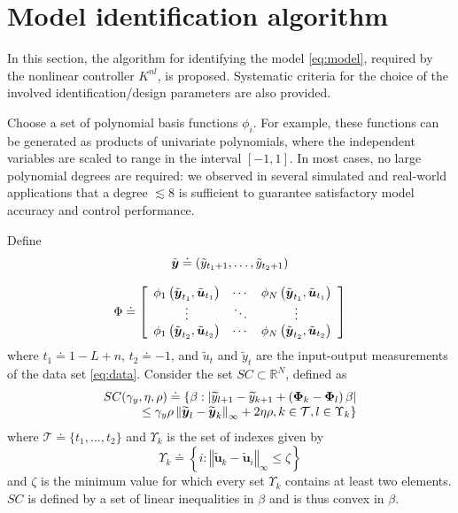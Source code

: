 \documentclass[twocolumn,english,journal]{IEEEtran}
\begin{document}
\section{Model identification algorithm}

\label{sec:design}

In this section, the algorithm for identifying the model \eqref{eq:model},
required by the nonlinear controller $K^{nl}$, is proposed. Systematic
criteria for the choice of the involved identification/design parameters
are also provided.

Choose a set of polynomial basis functions $\phi_{i}$. For example,
these functions can be generated as products of univariate polynomials,
where the independent variables are scaled to range in the interval
$[-1,1]$. In most cases, no large polynomial degrees are required:
we observed in several simulated and real-world applications that
a degree $\lesssim8$ is sufficient to guarantee satisfactory model
accuracy and control performance.

Define 
\[
\begin{array}[t]{c}
\tilde{\boldsymbol{y}}\doteq(\tilde{y}_{t_{1}+1},\ldots,\tilde{y}_{t_{2}+1})\\
\\
\Phi\doteq\left[\begin{array}{ccc}
\phi_{1}\left(\tilde{\boldsymbol{y}}_{t_{1}},\tilde{\boldsymbol{u}}_{t_{1}}\right) & \cdots & \phi_{N}\left(\tilde{\boldsymbol{y}}_{t_{1}},\tilde{\boldsymbol{u}}_{t_{1}}\right)\\
\vdots & \ddots & \vdots\\
\phi_{1}\left(\tilde{\boldsymbol{y}}_{t_{2}},\tilde{\boldsymbol{u}}_{t_{2}}\right) & \cdots & \phi_{N}\left(\tilde{\boldsymbol{y}}_{t_{2}},\tilde{\boldsymbol{u}}_{t_{2}}\right)
\end{array}\right]
\end{array}
\]
where $t_{1}\doteq1-L+n$, $t_{2}\doteq-1$, and $\tilde{u}_{t}$
and $\tilde{y}_{t}$ are the input-output measurements of the data
set \eqref{eq:data}. Consider the set $SC\subset\mathbb{R}^{N}$,
defined as
\[
\begin{array}[t]{r}
SC(\gamma_{y},\eta,\rho)\doteq\{\beta:\left\vert \widetilde{y}_{l+1}-\widetilde{y}_{k+1}+\left(\mathbf{\Phi}_{k}-\mathbf{\Phi}_{l}\right)\beta\right\vert \\
\leq\gamma_{y}\rho\left\Vert \widetilde{\boldsymbol{y}}_{l}-\widetilde{\boldsymbol{y}}_{k}\right\Vert _{\infty}+2\eta\rho,k\in\mathcal{T},l\in\Upsilon_{k}\}
\end{array}
\]
where $\mathcal{T}\doteq\{t_{1},\ldots,t_{2}\}$ and $\Upsilon_{k}$
is the set of indexes given by 
\[
\Upsilon_{k}\doteq\left\{ i:\left\Vert \tilde{\boldsymbol{u}}_{k}-\tilde{\boldsymbol{u}}_{i}\right\Vert _{\infty}\leq\zeta\right\} 
\]
and $\zeta$ is the minimum value for which every set $\Upsilon_{k}$
contains at least two elements. $SC$ is defined by a set of linear
inequalities in $\beta$ and is thus convex in $\beta$.
\end{document}
